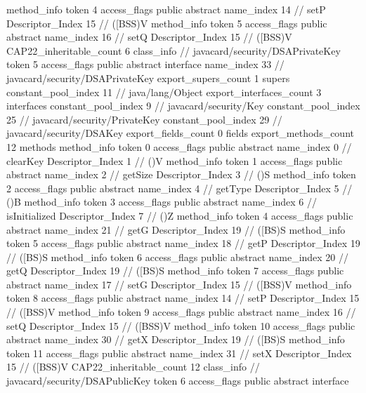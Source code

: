 {{{{{				}
				method_info {
					token	4
					access_flags	public abstract
					name_index	14		// setP
					Descriptor_Index	15		// ([BSS)V
				}
				method_info {
					token	5
					access_flags	public abstract
					name_index	16		// setQ
					Descriptor_Index	15		// ([BSS)V
				}
			}
			CAP22_inheritable_count	6
		}
		class_info {		// javacard/security/DSAPrivateKey
			token	5
			access_flags	public abstract interface
			name_index	33		// javacard/security/DSAPrivateKey
			export_supers_count	1
			supers {
				constant_pool_index	11		// java/lang/Object
			}
			export_interfaces_count	3
			interfaces {
				constant_pool_index	9		// javacard/security/Key
				constant_pool_index	25		// javacard/security/PrivateKey
				constant_pool_index	29		// javacard/security/DSAKey
			}
			export_fields_count	0
			fields {
			}
			export_methods_count	12
			methods {
				method_info {
					token	0
					access_flags	public abstract
					name_index	0		// clearKey
					Descriptor_Index	1		// ()V
				}
				method_info {
					token	1
					access_flags	public abstract
					name_index	2		// getSize
					Descriptor_Index	3		// ()S
				}
				method_info {
					token	2
					access_flags	public abstract
					name_index	4		// getType
					Descriptor_Index	5		// ()B
				}
				method_info {
					token	3
					access_flags	public abstract
					name_index	6		// isInitialized
					Descriptor_Index	7		// ()Z
				}
				method_info {
					token	4
					access_flags	public abstract
					name_index	21		// getG
					Descriptor_Index	19		// ([BS)S
				}
				method_info {
					token	5
					access_flags	public abstract
					name_index	18		// getP
					Descriptor_Index	19		// ([BS)S
				}
				method_info {
					token	6
					access_flags	public abstract
					name_index	20		// getQ
					Descriptor_Index	19		// ([BS)S
				}
				method_info {
					token	7
					access_flags	public abstract
					name_index	17		// setG
					Descriptor_Index	15		// ([BSS)V
				}
				method_info {
					token	8
					access_flags	public abstract
					name_index	14		// setP
					Descriptor_Index	15		// ([BSS)V
				}
				method_info {
					token	9
					access_flags	public abstract
					name_index	16		// setQ
					Descriptor_Index	15		// ([BSS)V
				}
				method_info {
					token	10
					access_flags	public abstract
					name_index	30		// getX
					Descriptor_Index	19		// ([BS)S
				}
				method_info {
					token	11
					access_flags	public abstract
					name_index	31		// setX
					Descriptor_Index	15		// ([BSS)V
				}
			}
			CAP22_inheritable_count	12
		}
		class_info {		// javacard/security/DSAPublicKey
			token	6
			access_flags	public abstract interface
}}}
